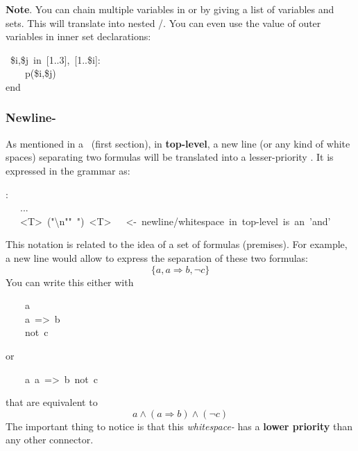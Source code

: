 {\noindent\textbf{Note}.
You can chain multiple variables in  or  by giving a
list of variables and sets. This will translate into nested
/. You can even use the value of outer variables in
inner set declarations:%
\begin{mdpre}%
~{\$i},{\$j}~{in}~{}[{1}..{3}],~{}[{1}..{\$i}]:\\
~~~~p({\$i},{\$j})\\
{end}%
\end{mdpre}%

\subsubsection{Newline-}\label{newline}%

\noindent As mentioned in a~ (first section), in \textbf{top-level}, a
new line (or any kind of white spaces) separating two formulas will be
translated into a lesser-priority . It is expressed in the grammar as:%
\begin{mdpre}%
:\\
~~\textbar{}~...\\
~~\textbar{}~{\textless{}T\textgreater{}}~("\textbackslash{}n"\textbar{}"~")~{\textless{}T\textgreater{}}~~~{\textless{}-~newline/whitespace~in~top-level~is~an~'and'}%
\end{mdpre}\noindent This notation is related to the idea of a set of formulas (premises). For
example, a new line would allow to express the separation of these two
formulas:
\noindent\noindent\[  \{a, a \Rightarrow b, \neg c\}
\]%
\noindent You can write this either with
\begin{mdpre}%
\noindent~~~~a\\
~~~~a~=\textgreater{}~b\\
~~~~not~c%
\end{mdpre}\noindent or
\begin{mdpre}%
\noindent~~~~a~a~=\textgreater{}~b~not~c%
\end{mdpre}\noindent that are equivalent to
\noindent\noindent\[  a \wedge (a \Rightarrow b) \wedge (\neg c)
\]%
\noindent The important thing to notice is that this \emph{whitespace-} has a
\textbf{lower priority} than any other connector.

}
